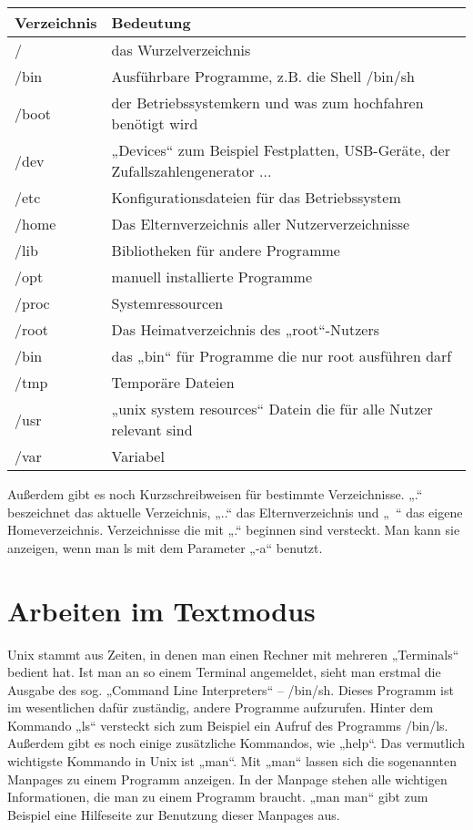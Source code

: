 \begin{table}
\centering
\begin{tabular}{l|l}
Verzeichnis & Bedeutung \\ \hline
/ & das Wurzelverzeichnis \\
/bin & Ausführbare Programme, z.B. die Shell /bin/sh \\
/boot & der Betriebssystemkern und was zum hochfahren benötigt wird \\
/dev & „Devices“ zum Beispiel Festplatten, USB-Geräte, der Zufallszahlengenerator ...\\
/etc & Konfigurationsdateien für das Betriebssystem \\
/home & Das Elternverzeichnis aller Nutzerverzeichnisse \\
/lib & Bibliotheken für andere Programme \\
/opt & manuell installierte Programme \\
/proc & Systemressourcen \\
/root & Das Heimatverzeichnis des „root“-Nutzers \\
/bin & das „bin“ für Programme die nur root ausführen darf \\
/tmp & Temporäre Dateien \\
/usr & „unix system resources“ Datein die für alle Nutzer relevant sind \\
/var & Variabel
\end{tabular}
\label{UNIX-Verzeichnisse}
\end{table}

Außerdem gibt es noch Kurzschreibweisen für bestimmte Verzeichnisse. „.“ beszeichnet das aktuelle Verzeichnis, „..“ das Elternverzeichnis und „~“ das eigene Homeverzeichnis.
Verzeichnisse die mit „.“ beginnen sind versteckt. Man kann sie anzeigen, wenn man ls mit dem Parameter „-a“ benutzt.

\section{Arbeiten im Textmodus}
Unix stammt aus Zeiten, in denen man einen Rechner mit mehreren „Terminals“ bedient hat. 
Ist man an so einem Terminal angemeldet, sieht man erstmal die Ausgabe des sog. „Command Line Interpreters“ – /bin/sh.
Dieses Programm ist im wesentlichen dafür zuständig, andere Programme aufzurufen. Hinter dem Kommando „ls“ versteckt sich zum Beispiel ein Aufruf des Programms /bin/ls. Außerdem gibt es noch einige zusätzliche Kommandos, wie „help“. 
Das vermutlich wichtigste Kommando in Unix ist „man“. Mit „man“ lassen sich die sogenannten Manpages zu einem Programm anzeigen. In der Manpage stehen alle wichtigen Informationen, die man zu einem Programm braucht.
„man man“ gibt zum Beispiel eine Hilfeseite zur Benutzung dieser Manpages aus.

